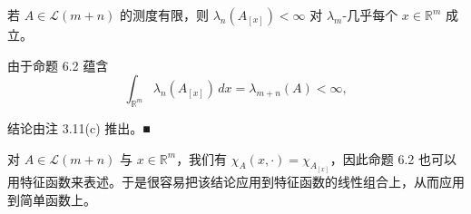 \begin{corollary}

若 $ A \in \mathcal{L}(m+n) $ 的测度有限，则 $ \lambda_n(A_{[x]}) < \infty $ 对 $ \lambda_m $-几乎每个 $ x \in \mathbb{R}^m $ 成立。

\proofhead
由于命题 6.2 蕴含
\[
\int_{\mathbb{R}^m} \lambda_n(A_{[x]}) \, dx = \lambda_{m+n}(A) < \infty ,
\]

结论由注 3.11(c) 推出。\nobreak\hspace{0.35em}■

\end{corollary}

对 $ A \in \mathcal{L}(m+n) $ 与 $ x \in \mathbb{R}^m $，我们有 $ \chi_A(x, \cdot) = \chi_{A_{[x]}} $，因此命题 6.2 也可以用特征函数来表述。于是很容易把该结论应用到特征函数的线性组合上，从而应用到简单函数上。

